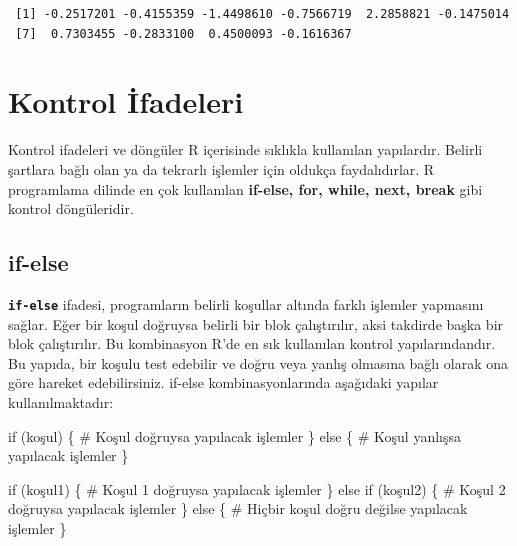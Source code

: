 \documentclass[
  letterpaper,
  DIV=11,
  numbers=noendperiod]{scrreprt}
\newenvironment{Shaded}{\begin{snugshade}}{\end{snugshade}}
\newcommand{\CommentTok}[1]{\textcolor[rgb]{0.37,0.37,0.37}{#1}}
\newcommand{\ControlFlowTok}[1]{\textcolor[rgb]{0.00,0.23,0.31}{#1}}
\newcommand{\NormalTok}[1]{\textcolor[rgb]{0.00,0.23,0.31}{#1}}
\begin{document}
\begin{verbatim}
 [1] -0.2517201 -0.4155359 -1.4498610 -0.7566719  2.2858821 -0.1475014
 [7]  0.7303455 -0.2833100  0.4500093 -0.1616367
\end{verbatim}

\hypertarget{kontrol-ifadeleri}{%
\chapter{Kontrol İfadeleri}\label{kontrol-ifadeleri}}

Kontrol ifadeleri ve döngüler R içerisinde sıklıkla kullanılan
yapılardır. Belirli şartlara bağlı olan ya da tekrarlı işlemler için
oldukça faydalıdırlar. R programlama dilinde en çok kullanılan
\textbf{if-else, for, while, next, break} gibi kontrol döngüleridir.

\hypertarget{if-else}{%
\section{if-else}\label{if-else}}

\textbf{\texttt{if-else}} ifadesi, programların belirli koşullar altında
farklı işlemler yapmasını sağlar. Eğer bir koşul doğruysa belirli bir
blok çalıştırılır, aksi takdirde başka bir blok çalıştırılır. Bu
kombinasyon R'de en sık kullanılan kontrol yapılarındandır. Bu yapıda,
bir koşulu test edebilir ve doğru veya yanlış olmasına bağlı olarak ona
göre hareket edebilirsiniz. if-else kombinasyonlarında aşağıdaki yapılar
kullanılmaktadır:

\begin{Shaded}
\begin{Highlighting}[]
\ControlFlowTok{if}\NormalTok{ (koşul) \{}
  \CommentTok{\# Koşul doğruysa yapılacak işlemler}
\NormalTok{\} }\ControlFlowTok{else}\NormalTok{ \{}
  \CommentTok{\# Koşul yanlışsa yapılacak işlemler}
\NormalTok{\}}
\end{Highlighting}
\end{Shaded}

\begin{Shaded}
\begin{Highlighting}[]
\ControlFlowTok{if}\NormalTok{ (koşul1) \{}
  \CommentTok{\# Koşul 1 doğruysa yapılacak işlemler}
\NormalTok{\} }\ControlFlowTok{else} \ControlFlowTok{if}\NormalTok{ (koşul2) \{}
  \CommentTok{\# Koşul 2 doğruysa yapılacak işlemler}
\NormalTok{\} }\ControlFlowTok{else}\NormalTok{ \{}
  \CommentTok{\# Hiçbir koşul doğru değilse yapılacak işlemler}
\NormalTok{\}}
\end{Highlighting}
\end{Shaded}
\end{document}
